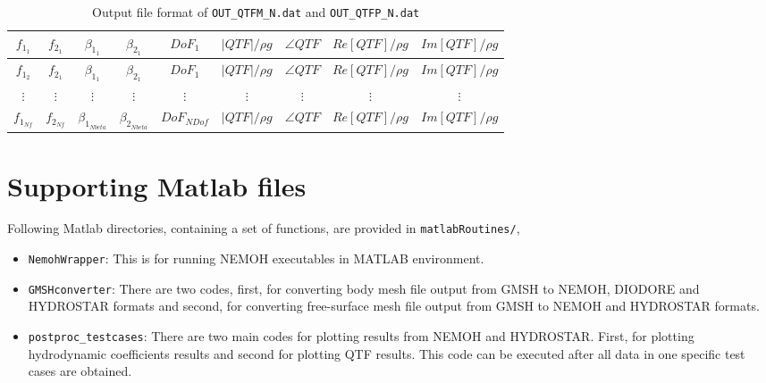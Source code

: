 \documentclass[12pt,a4paper,titlepage]{article}
\begin{document}
\begin{table}[ht]
\begin{center}
\caption{Output file format of \texttt{OUT\_QTFM\_N.dat} and \texttt{OUT\_QTFP\_N.dat}}\label{tab:QTF}
\begin{tabular}{ccccccccc}
\hline
$f_{1_1}$& $f_{2_1}$ & $\beta_{1_1}$& $\beta_{2_1}$ & $DoF_1$ & $|QTF|/\rho g$& $\angle QTF$& $Re[QTF]/\rho g$& $Im[QTF]/\rho g$\\
\hline
$f_{1_2}$& $f_{2_1}$ & $\beta_{1_1}$& $\beta_{2_1}$ & $DoF_1$ & $|QTF|/\rho g$& $\angle QTF$& $Re[QTF]/\rho g$& $Im[QTF]/\rho g$\\
\hline
$\vdots$&$\vdots$&$\vdots$&$\vdots$&$\vdots$&$\vdots$&$\vdots$&$\vdots$&$\vdots$\\
\hline
$f_{1_{Nf}}$& $f_{2_{Nf}}$ & $\beta_{1_{Nbeta}}$& $\beta_{2_{Nbeta}}$ & $DoF_{NDof}$ & $|QTF|/\rho g$& $\angle QTF$& $Re[QTF]/\rho g$& $Im[QTF]/\rho g$\\
\hline
\end{tabular}
\end{center}
\end{table}



\section{Supporting Matlab files}\label{Sec:MatlabFiles}
Following Matlab directories, containing a set of functions, are provided in \texttt{matlabRoutines/},
\begin{itemize}
    \item \texttt{NemohWrapper}: This is for running NEMOH executables in MATLAB environment. %
    \item \texttt{GMSHconverter}: There are two codes, first, for converting body mesh file output from GMSH to NEMOH, DIODORE and HYDROSTAR formats and second, for converting free-surface mesh file output from GMSH to NEMOH and HYDROSTAR formats.
    \item \texttt{postproc\_testcases}: There are two main codes for plotting results from NEMOH and HYDROSTAR. First, for plotting hydrodynamic coefficients results and second for plotting QTF results. This code can be executed after all data in one specific test cases are obtained.
\end{itemize}
\end{document}
